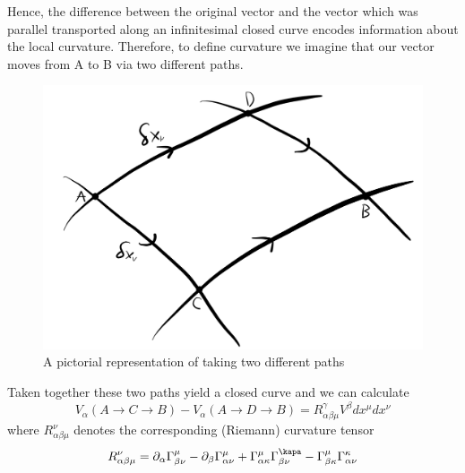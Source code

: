 Hence, the difference between the original vector and the vector which was parallel transported along an infinitesimal closed curve encodes information about the local curvature.
Therefore, to define curvature we imagine that our vector moves from A to B via two different paths.
\begin{figure}[!ht]
	\centering
	\includegraphics[scale=0.5]{Figures/curvatureloop.png}
	\caption{A pictorial representation of taking two different paths}
\end{figure}
Taken together these two paths yield a closed curve and we can calculate
\begin{equation}
    V_{\alpha}(A \rightarrow C \rightarrow B)  - V_{\alpha}(A \rightarrow D \rightarrow B) = R^{\gamma}_{\alpha \beta \mu}V^{\beta}dx^{\mu}dx^{\nu}
\end{equation}
where $R^{\nu}_{\alpha \beta \mu}$
denotes the corresponding (Riemann) curvature tensor
\begin{equation}
    R^{\nu}_{\alpha \beta \mu} =  \partial_{\alpha}\Gamma^{\mu}_{\beta \nu} - \partial_{\beta}\Gamma^{\mu}_{\alpha \nu} + \Gamma^{\mu}_{\alpha \kappa}\Gamma^{\kapa}_{\beta \nu} - \Gamma^{\mu}_{\beta \kappa}\Gamma^{\kappa}_{\alpha \nu}
\end{equation}
